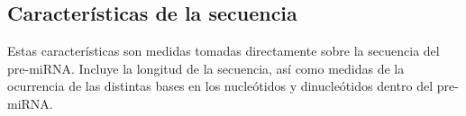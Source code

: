 \subsection{Características de la secuencia}
Estas características son medidas tomadas directamente sobre la
secuencia del pre-miRNA. Incluye la longitud de la secuencia, así como
medidas de la ocurrencia de las distintas bases en los nucleótidos y
dinucleótidos dentro del pre-miRNA.

\setcounter{FeatureCounter}{43}